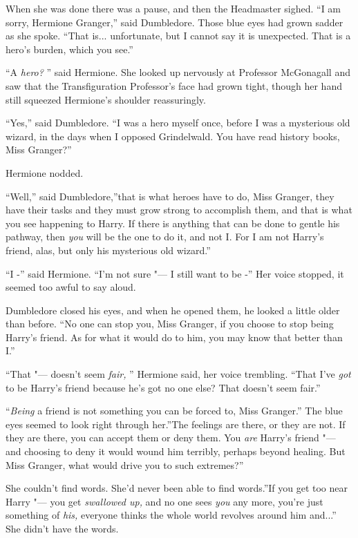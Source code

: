 When she was done there was a pause, and then the Headmaster sighed. ``I
am sorry, Hermione Granger,'' said Dumbledore. Those blue eyes had grown
sadder as she spoke. ``That is... unfortunate, but I cannot say it
is unexpected. That is a hero's burden, which you see.''

``A \emph{hero?} '' said Hermione. She looked up nervously at Professor
McGonagall and saw that the Transfiguration Professor's face had grown
tight, though her hand still squeezed Hermione's shoulder reassuringly.

``Yes,'' said Dumbledore. ``I was a hero myself once, before I was a
mysterious old wizard, in the days when I opposed Grindelwald. You have
read history books, Miss Granger?''

Hermione nodded.

``Well,'' said Dumbledore,''that is what heroes have to do, Miss
Granger, they have their tasks and they must grow strong to accomplish
them, and that is what you see happening to Harry. If there is anything
that can be done to gentle his pathway, then \emph{you} will be the one
to do it, and not I. For I am not Harry's friend, alas, but only his
mysterious old wizard.''

``I -'' said Hermione. ``I'm not sure "--- I still want to be -'' Her voice
stopped, it seemed too awful to say aloud.

Dumbledore closed his eyes, and when he opened them, he looked a little
older than before. ``No one can stop you, Miss Granger, if you choose to
stop being Harry's friend. As for what it would do to him, you may know
that better than I.''

``That "--- doesn't seem \emph{fair,} '' Hermione said, her voice trembling.
``That I've \emph{got} to be Harry's friend because he's got no one else?
That doesn't seem fair.''

``\emph{Being} a friend is not something you can be forced to, Miss
Granger.'' The blue eyes seemed to look right through her.''The feelings
are there, or they are not. If they are there, you can accept them or
deny them. You \emph{are} Harry's friend "--- and choosing to deny it would
wound him terribly, perhaps beyond healing. But Miss Granger, what would
drive you to such extremes?''

She couldn't find words. She'd never been able to find words.''If you
get too near Harry "--- you get \emph{swallowed up,} and no one sees
\emph{you} any more, you're just something of \emph{his,} everyone
thinks the whole world revolves around him and...'' She didn't have
the words.

